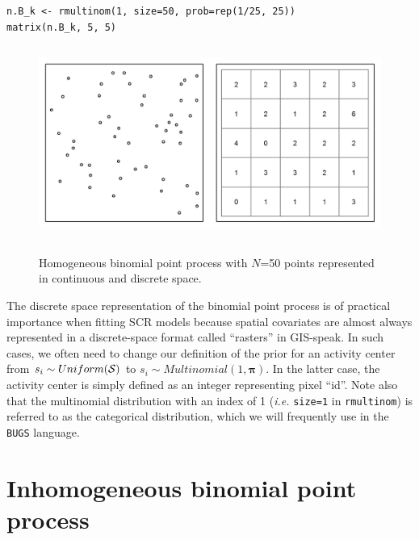 \begin{verbatim}
n.B_k <- rmultinom(1, size=50, prob=rep(1/25, 25))
matrix(n.B_k, 5, 5)
\end{verbatim}


\begin{figure}
\centering
\includegraphics[width=5in,height=2.5in]{Ch11/figs/homoPlots}
\label{ch9.fig.homo}
\caption{Homogeneous binomial point process with $N$=50 points
  represented in continuous and discrete space.}
\end{figure}


The discrete space representation of the binomial point process is of
practical importance when fitting SCR models because spatial covariates
are almost always represented in a discrete-space format called
``rasters'' in GIS-speak. In such cases, we often need to change our
definition of the prior for an activity center from $s_i \sim
Uniform(\cal{S})$ to $s_i \sim Multinomial(1, \mathbf{\pi})$. In the
latter case, the activity center is simply defined as an integer
representing pixel ``id''. Note also that the multinomial distribution
with an index of 1 (\emph{i.e.} \verb+size=1+ in \verb+rmultinom+)
is referred to as the categorical distribution,
which we will frequently use in the \verb+BUGS+ language.



\section{Inhomogeneous binomial point process}

